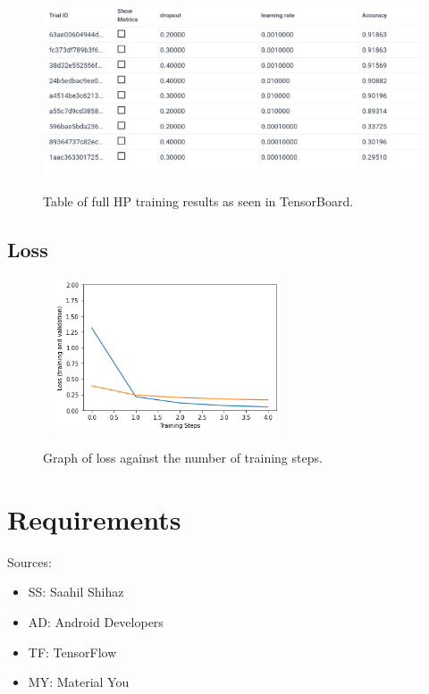 \documentclass[12pt,a4paper]{report}
\begin{document}
\label{subsec:hp}

\begin{figure}[h]\
    \centering
    \includegraphics[width=\textwidth]{full_hp.png}
    \caption{Table of full HP training results as seen in TensorBoard.}
    \label{fig:hp_full}
\end{figure}

\subsection{Loss}

\label{subsec:loss}

\begin{figure}[h]\
    \centering
    \includegraphics[width=0.6\textwidth]{inception_loss.png}
    \caption{Graph of loss against the number of training steps.}
    \label{fig:incep_loss}
\end{figure}

\clearpage

\section{Requirements}

Sources:
\begin{itemize}
    \item SS: Saahil Shihaz
    \item AD: Android Developers
    \item TF: TensorFlow
    \item MY: Material You
\end{itemize}
\end{document}

